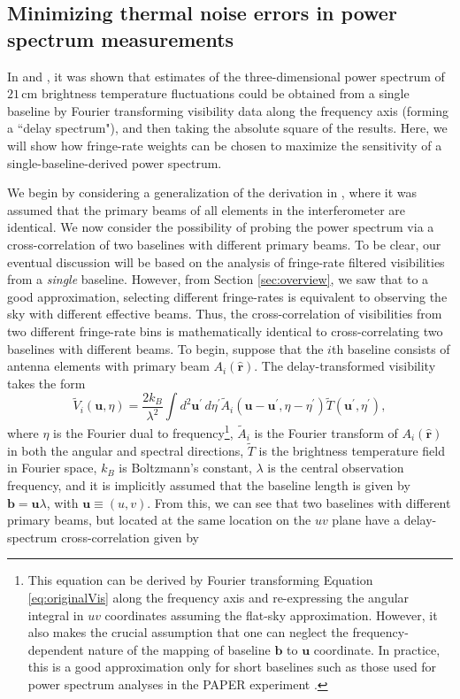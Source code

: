 \documentclass[twocolumn,apj,numberedappendix]{emulateapj}
\newcommand{\rhat}{\hat{\mathbf{r}}}
\begin{document}
\subsection{Minimizing thermal noise errors in power spectrum measurements}
\label{sec:PspecOptimization}

In \citet{parsons_et_al2012a} and \citet{P14}, it was shown that estimates of the three-dimensional power spectrum of $21\,\textrm{cm}$ brightness temperature fluctuations could be obtained from a single baseline by Fourier transforming visibility data along the frequency axis (forming a ``delay spectrum"), and then taking the absolute square of the results. Here, we will show how fringe-rate weights can be chosen to maximize the sensitivity of a single-baseline-derived power spectrum.

We begin by considering a generalization of the derivation in \citet{P14}, where it was assumed that the primary beams of all elements in the interferometer are identical. We now consider the possibility of probing the power spectrum via a cross-correlation of two baselines with different primary beams. To be clear, our eventual discussion will be based on the analysis of fringe-rate filtered visibilities from a \emph{single} baseline. However, from Section \ref{sec:overview}, we saw that to a good approximation, selecting different fringe-rates is equivalent to observing the sky with different effective beams. Thus, the cross-correlation of visibilities from two different fringe-rate bins is mathematically identical to cross-correlating two baselines with different beams. To begin, suppose that the $i$th baseline consists of antenna elements with primary beam $A_i (\rhat)$. The delay-transformed visibility takes the form
\begin{equation}
\widetilde{V}_i(\mathbf{u},\eta) = \frac{2 k_B}{\lambda^2} \int  d^2 \mathbf{u}^\prime \, d\eta^\prime \widetilde{A}_i (\mathbf{u} -\mathbf{u}^\prime, \eta-\eta^\prime) \widetilde{T}(\mathbf{u}^\prime , \eta^\prime),
\end{equation}
where $\eta$ is the Fourier dual to frequency\footnote{This equation can be derived by Fourier transforming Equation 
\ref{eq:originalVis} along the frequency axis and re-expressing the angular integral in $uv$ coordinates assuming the flat-sky approximation. However, it also makes the crucial assumption that one can neglect the frequency-dependent nature of the mapping of baseline $\mathbf{b}$ to $\mathbf{u}$ coordinate. In practice, this is a good approximation only for short baselines \citep{parsons_et_al2012b,liu_et_al2014a} such as those used for power spectrum analyses in the PAPER experiment \citep{P14,J14,ali_et_al2015}.
}, $\widetilde{A}_i $ is the Fourier transform of $A_i (\rhat)$ in both the angular and spectral directions, $\widetilde{T}$ is the brightness temperature field in Fourier space, $k_B$ is Boltzmann's constant, $\lambda$ is the central observation frequency, and it is implicitly assumed that the baseline length is given by $\mathbf{b} = \mathbf{u} \lambda$, with $\mathbf{u} \equiv (u,v)$. From this, we can see that two baselines with different primary beams, but located at the same location on the $uv$ plane have a delay-spectrum cross-correlation given by
\end{document}
